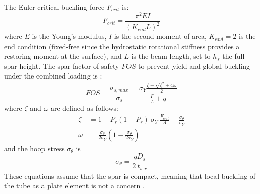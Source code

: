 The Euler critical buckling force $F_{crit}$ is:
\begin{equation}
    F_{crit} = \frac{\pi^2 E I}{(K_{end} L)^2}
\end{equation}
where $E$ is the Young's modulus, $I$ is the second moment of area, $K_{end}=2$ is the end condition (fixed-free since the hydrostatic rotational stiffness provides a restoring moment at the surface), and $L$ is the beam length, set to $h_s$ the full spar height.
The spar factor of safety $FOS$ to prevent yield and global buckling under the combined loading is \cite{american_bureau_of_shipping_requirements_2022}:
\begin{equation}
    FOS = \frac{\sigma_{s,max}}{\sigma_s} = \frac{\sigma_Y \frac{\zeta + \sqrt{\zeta^2+4\omega}}{2}}{\frac{F}{A} + q}
\end{equation}
where $\zeta$ and $\omega$ are defined as follows:
\begin{equation}
\begin{aligned}
     \zeta &= 1 - P_r(1 - P_r)~\sigma_Y~\frac{F_{crit}}{A} - \frac{\sigma_\theta}{\sigma_Y} \\
    \omega &= \frac{\sigma_\theta}{2\sigma_Y}  (1 - \frac{\sigma_\theta}{2\sigma_Y})
\end{aligned}
\end{equation}
and the hoop stress $\sigma_\theta$ is 
\begin{equation}
     \sigma_\theta = \frac{qD_s}{2~t_{s,r}}
\end{equation}
These equations assume that the spar is compact, meaning that local buckling of the tube as a plate element is not a concern \cite{american_bureau_of_shipping_requirements_2022}.

\clearpage
